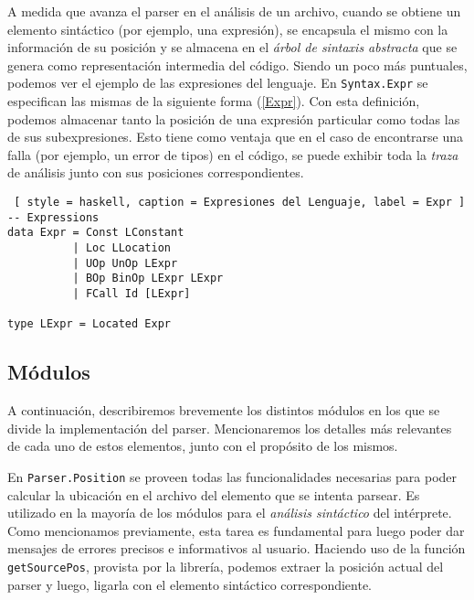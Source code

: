A medida que avanza el parser en el análisis de un archivo, cuando se obtiene un elemento sintáctico (por ejemplo, una expresión), se encapsula el mismo con la información de su posición y se almacena en el \textit{árbol de sintaxis abstracta} que se genera como representación intermedia del código.
Siendo un poco más puntuales, podemos ver el ejemplo de las expresiones del lenguaje.
En \lstinline[style = haskell]{Syntax.Expr} se especifican las mismas de la siguiente forma (\ref{Expr}).
Con esta definición, podemos almacenar tanto la posición de una expresión particular como todas las de sus subexpresiones.
Esto tiene como ventaja que en el caso de encontrarse una falla (por ejemplo, un error de tipos) en el código, se puede exhibir toda la \textit{traza} de análisis junto con sus posiciones correspondientes. 

\begin{lstlisting} [ style = haskell, caption = Expresiones del Lenguaje, label = Expr ]
-- Expressions
data Expr = Const LConstant
          | Loc LLocation
          | UOp UnOp LExpr
          | BOp BinOp LExpr LExpr
          | FCall Id [LExpr]

type LExpr = Located Expr
\end{lstlisting}

\subsection{Módulos}

A continuación, describiremos brevemente los distintos módulos en los que se divide la implementación del parser.
Mencionaremos los detalles más relevantes de cada uno de estos elementos, junto con el propósito de los mismos.

En \lstinline[style = haskell]{Parser.Position} se proveen todas las funcionalidades necesarias para poder calcular la ubicación en el archivo del elemento que se intenta parsear.
Es utilizado en la mayoría de los módulos para el \textit{análisis sintáctico} del intérprete.
Como mencionamos previamente, esta tarea es fundamental para luego poder dar mensajes de errores precisos e informativos al usuario.
Haciendo uso de la función \lstinline[style = haskell]{getSourcePos}, provista por la librería, podemos extraer la posición actual del parser y luego, ligarla con el elemento sintáctico correspondiente.

